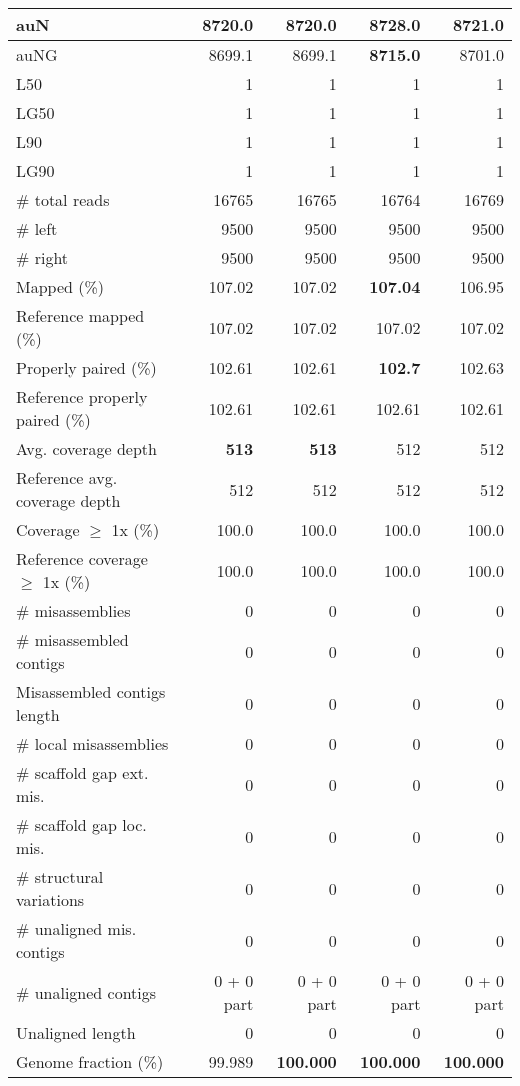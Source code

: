 \documentclass[12pt,a4paper]{article}
\begin{document}
\begin{table}[ht]
\begin{center}
\begin{tabular}{|l*{4}{|r}|}
auN & 8720.0 & 8720.0 & {\bf 8728.0} & 8721.0 \\ \hline
auNG & 8699.1 & 8699.1 & {\bf 8715.0} & 8701.0 \\ \hline
L50 & 1 & 1 & 1 & 1 \\ \hline
LG50 & 1 & 1 & 1 & 1 \\ \hline
L90 & 1 & 1 & 1 & 1 \\ \hline
LG90 & 1 & 1 & 1 & 1 \\ \hline
\# total reads & 16765 & 16765 & 16764 & 16769 \\ \hline
\# left & 9500 & 9500 & 9500 & 9500 \\ \hline
\# right & 9500 & 9500 & 9500 & 9500 \\ \hline
Mapped (\%) & 107.02 & 107.02 & {\bf 107.04} & 106.95 \\ \hline
Reference mapped (\%) & 107.02 & 107.02 & 107.02 & 107.02 \\ \hline
Properly paired (\%) & 102.61 & 102.61 & {\bf 102.7} & 102.63 \\ \hline
Reference properly paired (\%) & 102.61 & 102.61 & 102.61 & 102.61 \\ \hline
Avg. coverage depth & {\bf 513} & {\bf 513} & 512 & 512 \\ \hline
Reference avg. coverage depth & 512 & 512 & 512 & 512 \\ \hline
Coverage $\geq$ 1x (\%) & 100.0 & 100.0 & 100.0 & 100.0 \\ \hline
Reference coverage $\geq$ 1x (\%) & 100.0 & 100.0 & 100.0 & 100.0 \\ \hline
\# misassemblies & 0 & 0 & 0 & 0 \\ \hline
\# misassembled contigs & 0 & 0 & 0 & 0 \\ \hline
Misassembled contigs length & 0 & 0 & 0 & 0 \\ \hline
\# local misassemblies & 0 & 0 & 0 & 0 \\ \hline
\# scaffold gap ext. mis. & 0 & 0 & 0 & 0 \\ \hline
\# scaffold gap loc. mis. & 0 & 0 & 0 & 0 \\ \hline
\# structural variations & 0 & 0 & 0 & 0 \\ \hline
\# unaligned mis. contigs & 0 & 0 & 0 & 0 \\ \hline
\# unaligned contigs & 0 + 0 part & 0 + 0 part & 0 + 0 part & 0 + 0 part \\ \hline
Unaligned length & 0 & 0 & 0 & 0 \\ \hline
Genome fraction (\%) & 99.989 & {\bf 100.000} & {\bf 100.000} & {\bf 100.000} \\ \hline

\end{tabular}
\end{center}
\end{table}
\end{document}
